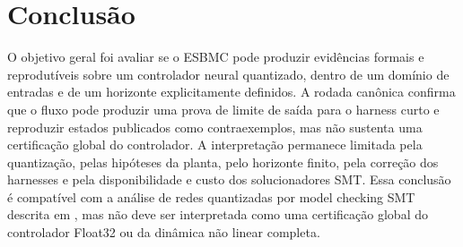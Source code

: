 \chapter{Conclusão}

O objetivo geral foi avaliar se o ESBMC pode produzir evidências formais e
reprodutíveis sobre um controlador neural quantizado, dentro de um domínio de
entradas e de um horizonte explicitamente definidos. A rodada canônica confirma
que o fluxo pode produzir uma prova de limite de saída para o harness curto e
reproduzir estados publicados como contraexemplos, mas não sustenta uma
certificação global do controlador. A interpretação permanece limitada pela
quantização, pelas hipóteses da planta, pelo horizonte finito, pela correção dos
harnesses e pela disponibilidade e custo dos solucionadores SMT.
Essa conclusão é compatível com a análise de redes quantizadas por model checking
SMT descrita em \cite{sena2021verifying,song2022qnnverifier}, mas não deve ser
interpretada como uma certificação global do controlador Float32 ou da dinâmica
não linear completa.

